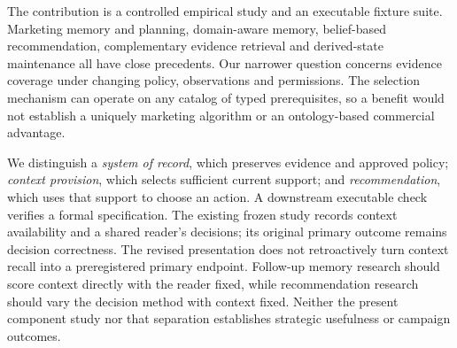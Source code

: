 The contribution is a controlled empirical study and an executable fixture suite. Marketing memory and planning, domain-aware memory, belief-based recommendation, complementary evidence retrieval and derived-state maintenance all have close precedents. Our narrower question concerns evidence coverage under changing policy, observations and permissions. The selection mechanism can operate on any catalog of typed prerequisites, so a benefit would not establish a uniquely marketing algorithm or an ontology-based commercial advantage.

We distinguish a \emph{system of record}, which preserves evidence and approved policy; \emph{context provision}, which selects sufficient current support; and \emph{recommendation}, which uses that support to choose an action. A downstream executable check verifies a formal specification. The existing frozen study records context availability and a shared reader's decisions; its original primary outcome remains decision correctness. The revised presentation does not retroactively turn context recall into a preregistered primary endpoint. Follow-up memory research should score context directly with the reader fixed, while recommendation research should vary the decision method with context fixed. Neither the present component study nor that separation establishes strategic usefulness or campaign outcomes.
